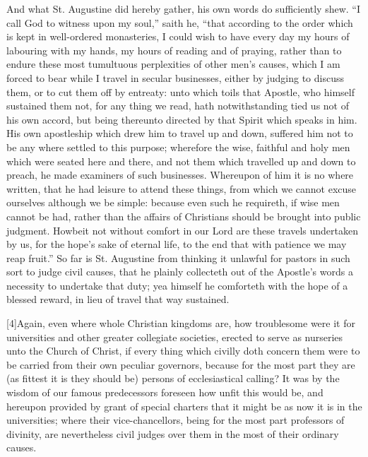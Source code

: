 And what St. Augustine did hereby gather, his own words do sufficiently shew. “I call God to witness upon my soul,” saith he, “that according to the order which is kept in well-ordered monasteries, I could wish to have every day my hours of labouring with my hands, my hours of reading and of praying, rather than to endure these most tumultuous perplexities of other men’s causes, which I am forced to bear while I travel in secular businesses, either by judging to discuss them, or to cut them off by entreaty: unto which toils that Apostle, who himself sustained them not, for any thing we read, hath notwithstanding tied us not of his own accord, but being thereunto directed by that Spirit which speaks in him. His own apostleship which  drew him to travel up and down, suffered him not to be any where settled to this purpose; wherefore the wise, faithful and holy men which were seated here and there, and not them which travelled up and down to preach, he made examiners of such businesses. Whereupon of him it is no where written, that he had leisure to attend these things, from which we cannot excuse ourselves although we be simple: because even such he requireth, if wise men cannot be had, rather than the affairs of Christians should be brought into public judgment. Howbeit not without comfort in our Lord are these travels undertaken by us, for the hope’s sake of eternal life, to the end that with patience we may reap fruit.” So far is St. Augustine from thinking it unlawful for pastors in such sort to judge civil causes, that he plainly collecteth out of the Apostle’s words a necessity to undertake that duty; yea himself he comforteth with the hope of a blessed reward, in lieu of travel that way sustained.

[4]Again, even where whole Christian kingdoms are, how troublesome were it for universities and other greater collegiate societies, erected to serve as nurseries unto the Church of Christ, if every thing which civilly doth concern them were to be carried from their own peculiar governors, because for the most part they are (as fittest it is they should be) persons of ecclesiastical calling? It was by the wisdom of our famous predecessors foreseen how unfit this would be, and hereupon provided by grant of special charters that it might be as now it is in the universities; where their vice-chancellors, being for the most part professors of divinity, are nevertheless civil judges over them in the most of their ordinary causes.

